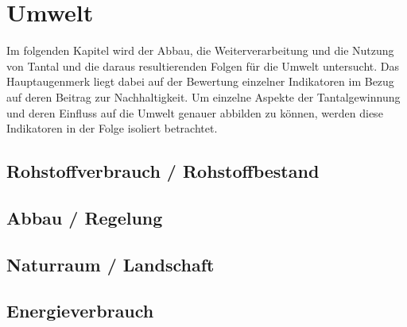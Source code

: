 \section{Umwelt}\label{sec:solutions}

Im folgenden Kapitel wird der Abbau, die Weiterverarbeitung und die Nutzung von Tantal und die daraus resultierenden Folgen für die Umwelt untersucht. Das Hauptaugenmerk liegt dabei auf der Bewertung einzelner Indikatoren im Bezug auf deren Beitrag zur Nachhaltigkeit. Um einzelne Aspekte der Tantalgewinnung und deren Einfluss auf die Umwelt genauer abbilden zu können, werden diese Indikatoren in der Folge isoliert betrachtet.

\subsection{Rohstoffverbrauch / Rohstoffbestand}

\subsection{Abbau / Regelung}

\subsection{Naturraum / Landschaft}

\subsection{Energieverbrauch}

